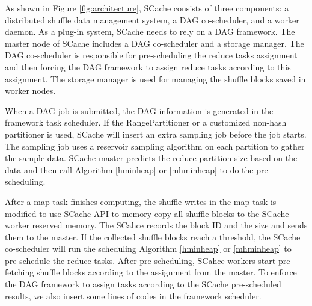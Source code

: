 {\color{blue}
As shown in Figure \ref{fig:architecture}, SCache consists of three components: a distributed shuffle data management system, a DAG co-scheduler, and a worker daemon.
As a plug-in system, SCache needs to rely on a DAG framework. 
The master node of SCache includes a DAG co-scheduler and a storage manager.
The DAG co-scheduler is responsible for pre-scheduling the reduce tasks assignment and then forcing the DAG framework to assign reduce tasks according to this assignment.
The storage manager is used for managing the shuffle blocks saved in worker nodes.

When a DAG job is submitted, the DAG information is generated in the framework task scheduler. 
If the RangePartitioner or a customized non-hash partitioner is used, SCache will insert an extra sampling job before the job starts.
The sampling job uses a reservoir sampling algorithm \cite{reservoir} on each partition to gather the sample data.
SCache master predicts the reduce partition size based on the data and then call Algorithm \ref{hminheap} or \ref{mhminheap} to do the pre-scheduling.

After a map task finishes computing, the shuffle writes in the map task is modified to use SCache API to memory copy all shuffle blocks to the SCache worker reserved memory.
The SCahce records the block ID and the size and sends them to the master.
If the collected shuffle blocks reach a threshold, the SCache co-scheduler will run the scheduling Algorithm \ref{hminheap} or \ref{mhminheap} to pre-schedule the reduce tasks.
After pre-scheduling, SCahce workers start pre-fetching shuffle blocks according to the assignment from the master.
To enforce the DAG framework to assign tasks according to the SCache pre-scheduled results, we also insert some lines of codes in the framework scheduler.
}
